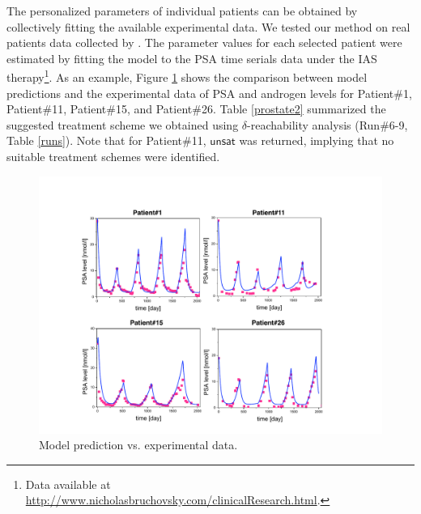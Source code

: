 The personalized parameters of individual patients can be obtained by collectively fitting the available experimental data. %
%
We tested our method on real patients data collected by \cite{bruchovsky07}. The parameter values for each selected patient were estimated by fitting the model to the PSA time serials data under the IAS therapy\footnote{Data available at \url{http://www.nicholasbruchovsky.com/clinicalResearch.html}.}. As an example, Figure \ref{fitting} shows the comparison between model predictions and the experimental data of PSA and androgen levels for Patient\#1, Patient\#11, Patient\#15, and Patient\#26. Table \ref{prostate2} summarized the suggested treatment scheme we obtained using $\delta$-reachability analysis (Run\#6-9, Table \ref{runs}). Note that for Patient\#11, $\mathsf{unsat}$ was returned, implying that no suitable treatment schemes were identified.


\begin{figure}[htb]
\centering
\includegraphics[scale=0.48]{fig-fitting}
\caption{Model prediction vs. experimental data.}
\label{fitting}
\end{figure}


